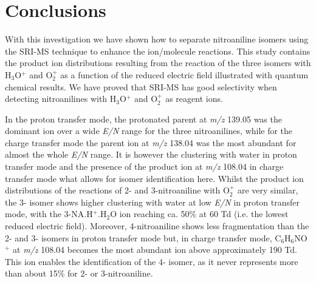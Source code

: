 \section{Conclusions}
With this investigation we have shown how to separate nitroaniline isomers using the SRI-MS technique to enhance the ion/molecule reactions. This study contains the product ion distributions resulting from the reaction of the three isomers with H$_3$O$^+$ and O$_2^+$ as a function of the reduced electric field illustrated with quantum chemical results. 
We have proved that SRI-MS has good selectivity when detecting nitroanilines with H$_3$O$^+$ and O$_2^+$ as reagent ions. 

In the proton transfer mode, the protonated parent at \textit{m/z} 139.05 was the dominant ion over a wide \textit{E/N} range for the three nitroanilines, while for the charge transfer mode the parent ion at \textit{m/z} 138.04 was the most abundant for almost the whole \textit{E/N} range.
It is however the clustering with water in proton transfer mode and the presence of the product ion at \textit{m/z} 108.04 in charge transfer mode what allows for isomer identification here. 
Whilst the product ion distributions of the reactions of 2- and 3-nitroaniline with O$_2^+$ are very similar, the 3- isomer shows higher clustering with water at low \textit{E/N} in proton transfer mode, with the 3-NA.H$^+$.H$_2$O ion reaching ca. 50\% at 60 Td (i.e. the lowest reduced electric field). 
Moreover, 4-nitroaniline shows less fragmentation than the 2- and 3- isomers in proton transfer mode but, in charge transfer mode, C$_6$H$_6$NO$^+$ at \textit{m/z} 108.04 becomes the most abundant ion above approximately 190 Td. 
This ion enables the identification of the 4- isomer, as it never represents more than about 15\% for 2- or 3-nitroaniline.

